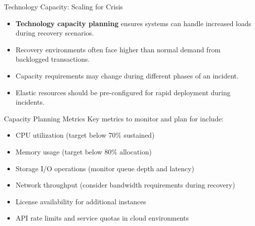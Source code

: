 \documentclass{beamer}
\begin{document}
\begin{frame}{Technology Capacity: Scaling for Crisis}
    \begin{itemize}
        \item \textbf{Technology capacity planning} ensures systems can handle increased loads during recovery scenarios.
        \item Recovery environments often face higher than normal demand from backlogged transactions.
        \item Capacity requirements may change during different phases of an incident.
        \item Elastic resources should be pre-configured for rapid deployment during incidents.
    \end{itemize}
    
    \begin{block}{Capacity Planning Metrics}
        Key metrics to monitor and plan for include:
        \scriptsize
        \begin{itemize}
            \item CPU utilization (target below 70\% sustained)
            \item Memory usage (target below 80\% allocation)
            \item Storage I/O operations (monitor queue depth and latency)
            \item Network throughput (consider bandwidth requirements during recovery)
            \item License availability for additional instances
            \item API rate limits and service quotas in cloud environments
        \end{itemize}
    \end{block}
\end{frame}
\end{document}
